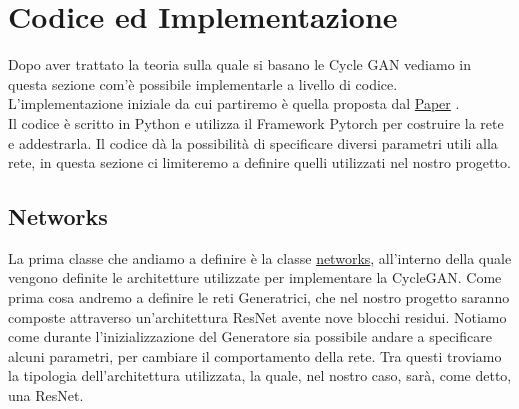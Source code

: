 \section{Codice ed Implementazione}
Dopo aver trattato la teoria sulla quale si basano le Cycle GAN vediamo in questa sezione com'è possibile implementarle a livello di codice. L'implementazione iniziale da cui partiremo è quella proposta dal  \href{https://github.com/junyanz/pytorch-CycleGAN-and-pix2pix}{Paper} \cite{Zhu_2017_ICCV}.
\\Il codice è scritto in Python e utilizza il Framework Pytorch per costruire la rete e addestrarla. Il codice dà la possibilità di specificare diversi parametri utili alla rete, in questa sezione ci limiteremo a definire quelli utilizzati nel nostro progetto.
\subsection{Networks}
La prima classe che andiamo a definire è la classe \href{https://github.com/junyanz/pytorch-CycleGAN-and-pix2pix/blob/master/models/networks.py}{networks}, all'interno della quale vengono definite le architetture utilizzate per implementare la CycleGAN.
Come prima cosa andremo a definire le reti Generatrici, che nel nostro progetto saranno composte attraverso un'architettura ResNet avente nove blocchi residui. Notiamo come durante l'inizializzazione del Generatore sia possibile andare a specificare alcuni parametri, per cambiare il comportamento della rete. Tra questi troviamo la tipologia dell'architettura utilizzata, la quale, nel nostro caso, sarà, come detto, una ResNet.

